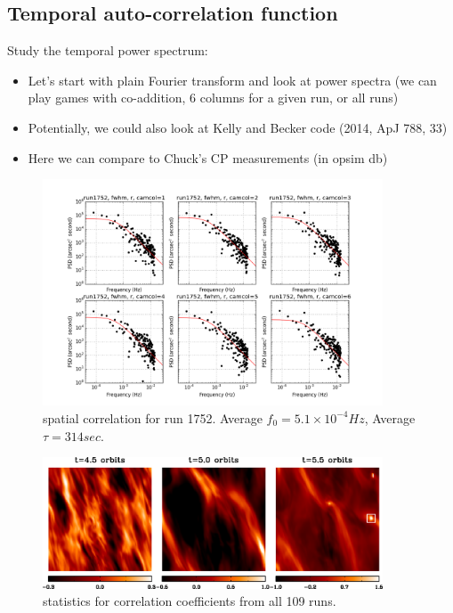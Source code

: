 \subsection{Temporal auto-correlation function}

Study the temporal power spectrum:
\begin{itemize}
\item Let's start with plain Fourier transform and look at power spectra (we can 
    play games with co-addition, 6 columns for a given run, or all runs)
\item Potentially, we could also look at  Kelly and Becker code  (2014, ApJ 788, 33) 
\item Here we can compare to Chuck's CP measurements (in opsim db) 
\end{itemize} 

\begin{figure}
\centering
\includegraphics[width=0.9\textwidth]{FIGURES/temporal.png}
\caption{spatial correlation for run 1752. Average
  $f_0 = 5.1\times 10^{-4} Hz$, Average $\tau = 314 sec.$ 
\label{fig:psd}}
\end{figure}

\begin{figure}
\centering
\includegraphics[width=0.9\textwidth]{FIGURES/f3.eps}
\caption{statistics for correlation coefficients from all 109 runs.
\label{fig:psd_stat}}
\end{figure}



